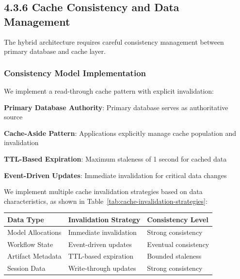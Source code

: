 \subsection*{4.3.6 Cache Consistency and Data Management}

The hybrid architecture requires careful consistency management between primary database and cache layer.

\subsubsection*{Consistency Model Implementation}

We implement a read-through cache pattern with explicit invalidation:

\begin{expandedlist}
    \item \textbf{Primary Database Authority}: Primary database serves as authoritative source
    \item \textbf{Cache-Aside Pattern}: Applications explicitly manage cache population and invalidation
    \item \textbf{TTL-Based Expiration}: Maximum staleness of 1 second for cached data
    \item \textbf{Event-Driven Updates}: Immediate invalidation for critical data changes
\end{expandedlist}

We implement multiple cache invalidation strategies based on data characteristics, as shown in Table~\ref{tab:cache-invalidation-strategies}:

\begin{center}
\begin{tabular}{@{}lll@{}}
\toprule
\textbf{Data Type} & \textbf{Invalidation Strategy} & \textbf{Consistency Level} \\
\midrule
Model Allocations & Immediate invalidation & Strong consistency \\
Workflow State & Event-driven updates & Eventual consistency \\
Artifact Metadata & TTL-based expiration & Bounded staleness \\
Session Data & Write-through updates & Strong consistency \\
\bottomrule
\end{tabular}
\label{tab:cache-invalidation-strategies}
\end{center}

